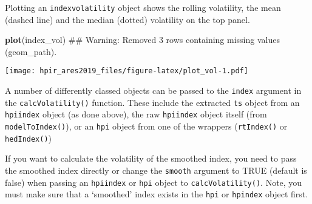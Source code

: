 \documentclass[]{article}
\newenvironment{Shaded}{\begin{snugshade}}{\end{snugshade}}
\newcommand{\KeywordTok}[1]{\textcolor[rgb]{0.13,0.29,0.53}{\textbf{#1}}}
\newcommand{\DataTypeTok}[1]{\textcolor[rgb]{0.13,0.29,0.53}{#1}}
\newcommand{\DecValTok}[1]{\textcolor[rgb]{0.00,0.00,0.81}{#1}}
\newcommand{\StringTok}[1]{\textcolor[rgb]{0.31,0.60,0.02}{#1}}
\newcommand{\CommentTok}[1]{\textcolor[rgb]{0.56,0.35,0.01}{\textit{#1}}}
\newcommand{\OperatorTok}[1]{\textcolor[rgb]{0.81,0.36,0.00}{\textbf{#1}}}
\newcommand{\NormalTok}[1]{#1}
\begin{document}
\begin{Shaded}
\end{Shaded}

Plotting an \texttt{indexvolatility} object shows the rolling
volatility, the mean (dashed line) and the median (dotted) volatility on
the top panel.

\begin{Shaded}
\begin{Highlighting}[]
  \KeywordTok{plot}\NormalTok{(index_vol)}
\NormalTok{## Warning: Removed 3 rows containing missing values (geom_path).}
\end{Highlighting}
\end{Shaded}

\texttt{[image: hpir\_ares2019\_files/figure-latex/plot\_vol-1.pdf]}

A number of differently classed objects can be passed to the
\texttt{index} argument in the \texttt{calcVolatility()} function. These
include the extracted \texttt{ts} object from an \texttt{hpiindex}
object (as done above), the raw \texttt{hpiindex} object itself (from
\texttt{modelToIndex()}), or an \texttt{hpi} object from one of the
wrappers (\texttt{rtIndex()} or \texttt{hedIndex()})

\begin{Shaded}
\end{Shaded}

If you want to calculate the volatility of the smoothed index, you need
to pass the smoothed index directly or change the \texttt{smooth}
argument to TRUE (default is false) when passing an \texttt{hpiindex} or
\texttt{hpi} object to \texttt{calcVolatility()}. Note, you must make
sure that a `smoothed' index exists in the \texttt{hpi} or
\texttt{hpindex} object first.
\end{document}
